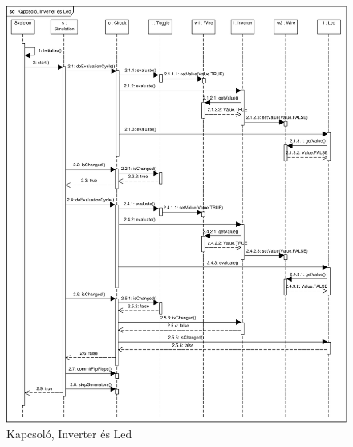 \begin{figure}[H]
\begin{center}
\includegraphics[width=17cm]{chapters/chapter05/imgs/test2.pdf}
\caption{Kapcsoló, Inverter és Led}
\label{fig:test2}
\end{center}
\end{figure}

